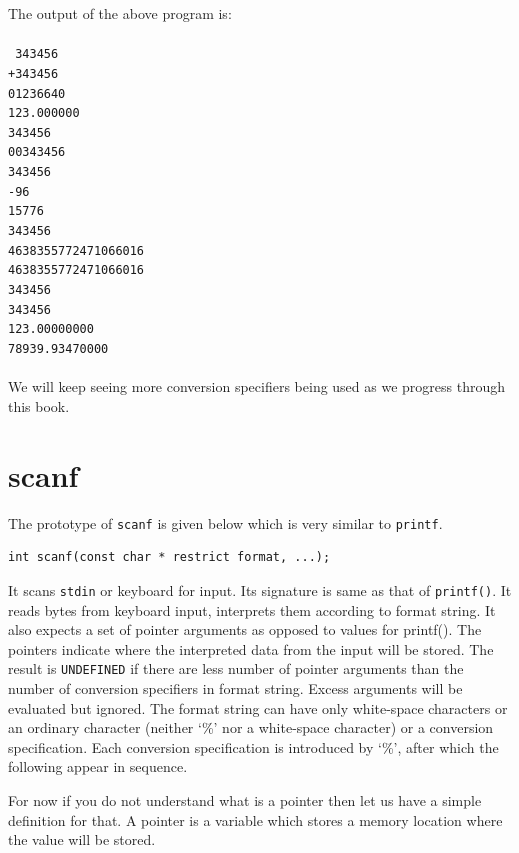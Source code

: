 The output of the above program is:
\\\\\texttt{ 343456\\
+343456\\
01236640\\
123.000000\\
343456\\
00343456\\
  343456\\
-96\\
15776\\
343456\\
4638355772471066016\\
4638355772471066016\\
343456\\
343456\\
123.00000000\\
78939.93470000\\\\}
We will keep seeing more conversion specifiers being used as we progress
through this book.

\section{scanf}
The prototype of \texttt{scanf} is given below which is very similar to
\texttt{printf}.

\begin{verbatim}
int scanf(const char * restrict format, ...);
\end{verbatim}
It scans \texttt{stdin} or keyboard for input. Its signature is same as that of
\texttt{printf()}. It reads bytes from keyboard input, interprets them
according to format string. It also expects a set of pointer arguments as
opposed to values for printf(). The pointers indicate where the interpreted
data from the input will be stored. The result is \texttt{UNDEFINED} if there
are less number of pointer arguments than the number of conversion specifiers in
format string. Excess arguments will be evaluated but ignored. The format
string can have only white-space characters or an ordinary character (neither
`\%' nor a white-space character) or a conversion specification. Each
conversion specification is introduced by `\%', after which the following
appear in sequence.

For now if you do not understand what is a pointer then let us have a simple
definition for that. A pointer is a variable which stores a memory location
where the value will be stored.

